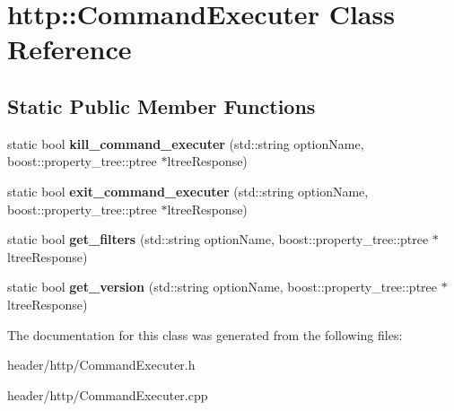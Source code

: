 \hypertarget{classhttp_1_1_command_executer}{}\section{http\+:\+:Command\+Executer Class Reference}
\label{classhttp_1_1_command_executer}
\subsection*{Static Public Member Functions}
\begin{DoxyCompactItemize}
\item 
\mbox{\label{classhttp_1_1_command_executer_aeb85d3105f3a4a2445ae67823bb79da0}} 
static bool {\bfseries kill\+\_\+command\+\_\+executer} (std\+::string option\+Name, boost\+::property\+\_\+tree\+::ptree $\ast$ltree\+Response)
\item 
\mbox{\label{classhttp_1_1_command_executer_a81f9125f274d6ed0f434b58ba5ff5b17}} 
static bool {\bfseries exit\+\_\+command\+\_\+executer} (std\+::string option\+Name, boost\+::property\+\_\+tree\+::ptree $\ast$ltree\+Response)
\item 
\mbox{\label{classhttp_1_1_command_executer_ab6a3dc2b199e1679bca354479d36b6a6}} 
static bool {\bfseries get\+\_\+filters} (std\+::string option\+Name, boost\+::property\+\_\+tree\+::ptree $\ast$ltree\+Response)
\item 
\mbox{\label{classhttp_1_1_command_executer_a45be01ac8cef73eb6610441723e3f69e}} 
static bool {\bfseries get\+\_\+version} (std\+::string option\+Name, boost\+::property\+\_\+tree\+::ptree $\ast$ltree\+Response)
\end{DoxyCompactItemize}


The documentation for this class was generated from the following files\+:\begin{DoxyCompactItemize}
\item 
header/http/Command\+Executer.\+h\item 
header/http/Command\+Executer.\+cpp\end{DoxyCompactItemize}
